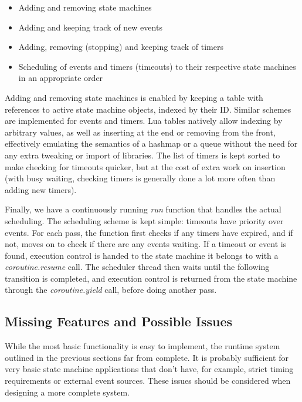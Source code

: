 \begin{itemize}
	\item Adding and removing state machines
	\item Adding and keeping track of new events
	\item Adding, removing (stopping) and keeping track of timers
	\item Scheduling of events and timers (timeouts) to their respective state machines in an appropriate order
\end{itemize}

Adding and removing state machines is enabled by keeping a table with references to active state machine objects, indexed by their ID. Similar schemes are implemented for events and timers. Lua tables natively allow indexing by arbitrary values, as well as inserting at the end or removing from the front, effectively emulating the semantics of a hashmap or a queue without the need for any extra tweaking or import of libraries. The list of timers is kept sorted to make checking for timeouts quicker, but at the cost of extra work on insertion (with busy waiting, checking timers is generally done a lot more often than adding new timers).

Finally, we have a continuously running \emph{run} function that handles the actual scheduling. The scheduling scheme is kept simple: timeouts have priority over events. For each pass, the function first checks if any timers have expired, and if not, moves on to check if there are any events waiting. If a timeout or event is found, execution control is handed to the state machine it belongs to with a \emph{coroutine.resume} call. The scheduler thread then waits until the following transition is completed, and execution control is returned from the state machine through the \emph{coroutine.yield} call, before doing another pass.

\subsection{Missing Features and Possible Issues}
\label{sec:runtime_system_issues}
While the most basic functionality is easy to implement, the runtime system outlined in the previous sections far from complete. It is probably sufficient for very basic state machine applications that don't have, for example, strict timing requirements or external event sources. These issues should be considered when designing a more complete system.

